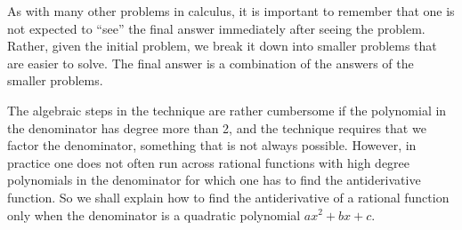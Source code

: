 \documentclass{ximera}
\begin{document}
As with many other problems in calculus, it is important to remember
that one is not expected to ``see'' the final answer immediately after
seeing the problem. Rather, given the initial problem, we break it
down into smaller problems that are easier to solve. The final answer
is a combination of the answers of the smaller problems.





The algebraic steps in the technique
are rather cumbersome if the polynomial in the denominator has degree
more than 2, and the technique requires that we factor the
denominator, something that is not always possible.  However, in
practice one does not often run across rational functions with high
degree polynomials in the denominator for which one has to find the
antiderivative function.  So we shall explain how to find the
antiderivative of a rational function only when the denominator is a
quadratic polynomial $ax^2+bx+c$.
\end{document}
